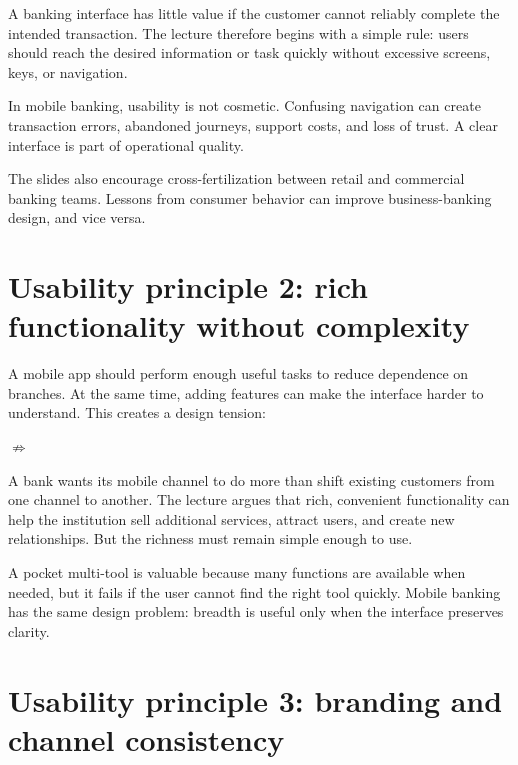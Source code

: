 A banking interface has little value if the customer cannot reliably complete the intended transaction. The lecture therefore begins with a simple rule: users should reach the desired information or task quickly without excessive screens, keys, or navigation.

\begin{keyidea}
In mobile banking, usability is not cosmetic. Confusing navigation can create transaction errors, abandoned journeys, support costs, and loss of trust. A clear interface is part of operational quality.
\end{keyidea}

The slides also encourage cross-fertilization between retail and commercial banking teams. Lessons from consumer behavior can improve business-banking design, and vice versa.

\section{Usability principle 2: rich functionality without complexity}

A mobile app should perform enough useful tasks to reduce dependence on branches. At the same time, adding features can make the interface harder to understand. This creates a design tension:

\begin{center}
 $\not\Rightarrow$ 
\end{center}

A bank wants its mobile channel to do more than shift existing customers from one channel to another. The lecture argues that rich, convenient functionality can help the institution sell additional services, attract users, and create new relationships. But the richness must remain simple enough to use.

\begin{analogy}
A pocket multi-tool is valuable because many functions are available when needed, but it fails if the user cannot find the right tool quickly. Mobile banking has the same design problem: breadth is useful only when the interface preserves clarity.
\end{analogy}

\section{Usability principle 3: branding and channel consistency}

